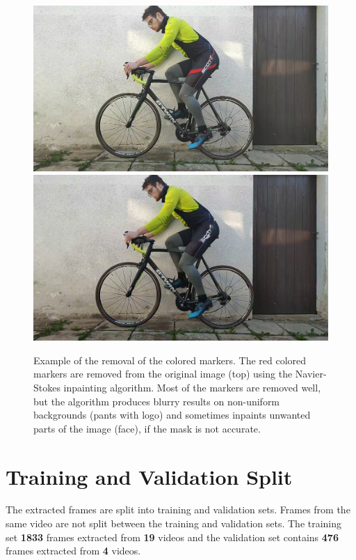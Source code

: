 \begin{figure}

    \centering
    \includegraphics[width=1\linewidth]{obrazky-figures/inpainting_original.jpg}
    \includegraphics[width=1\linewidth]{obrazky-figures/inpainting.jpg}
    \caption{Example of the removal of the colored markers. The red colored markers are removed from the original image (top) using the Navier-Stokes inpainting algorithm. Most of the markers are removed well, but the algorithm produces blurry results on non-uniform backgrounds (pants with logo) and sometimes inpaints unwanted parts of the image (face), if the mask is not accurate.}
    \label{fig:inpainting}
\end{figure}


\section{Training and Validation Split}
\label{evaluation_dataset}
The extracted frames are split into training and validation sets. Frames from the same video are not split between the training and validation sets. The training set \textbf{1833} frames extracted from \textbf{19} videos and the validation set contains \textbf{476} frames extracted from \textbf{4} videos.





